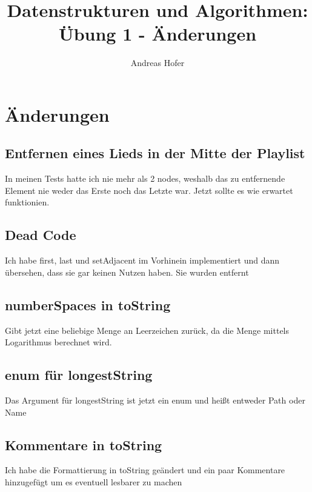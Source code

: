 \documentclass{article}
\title{\vspace{-1cm}Datenstrukturen und Algorithmen: Übung 1 - Änderungen}
\author{Andreas Hofer}
\begin{document}
	\maketitle
	\section*{Änderungen}
	\subsection*{Entfernen eines Lieds in der Mitte der Playlist}
	In meinen Tests hatte ich nie mehr als 2 nodes, weshalb das zu entfernende Element nie weder das Erste noch das Letzte war. Jetzt sollte es wie erwartet funktionien.
	\subsection*{Dead Code}
	Ich habe first, last und setAdjacent im Vorhinein implementiert und dann übersehen, dass sie gar keinen Nutzen haben. Sie wurden entfernt
	\subsection*{numberSpaces in toString}
	Gibt jetzt eine beliebige Menge an Leerzeichen zurück, da die Menge mittels Logarithmus berechnet wird.
	\subsection*{enum für longestString}
	Das Argument für longestString ist jetzt ein enum und heißt entweder Path oder Name
	\subsection*{Kommentare in toString}
	Ich habe die Formattierung in toString geändert und ein paar Kommentare hinzugefügt um es eventuell lesbarer zu machen


	























  
\end{document}
